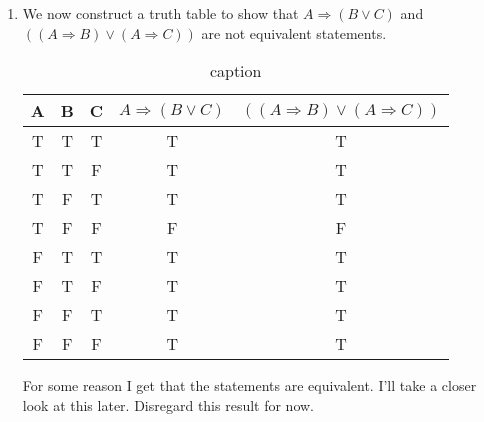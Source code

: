 \documentclass[a4paper, 11pt]{report}
\theoremstyle{plain}
\theoremstyle{definition}
\newcommand{\impl}{\Longrightarrow}
\renewcommand{\neg}{{\sim}} %
\begin{document}
\begin{enumerate}
\begin{enumerate}[a)]
        This is not very rigorous, but constructing a truth table will show
        that it holds.
      
      \item We consider the statement "Every even integer greater than 2 can be expressed as the sum of two prime numbers".
        We want to find two equivalent rephrasings of this statement. We first observe
        that it is on the form
        \begin{quote}
          For all integers $x$, if $x$ is even and $x > 2$, then $x$ can be written as the sum of two prime numbers.
        \end{quote}
        We can now consider for instance the contrapositive of this statement:
        \begin{quote}
          For all integers $x$, if $x$ cannot be written as the sum of two
          prime numbers, then $x$ is odd or $x \leq 2$.\footnote{I do
          \textbf{not}negate the quantifier here because it is not part of the
        conclusion nor the hypothesis hence does not get negated.}
        \end{quote}

        We can also rephrase the statement in terms of a contradiction. We assume the negation of the implication.
        \begin{quote}
          "If $x$ is even and $x > 2$, and $x$ cannot be written as the sum of
          two prime numbers, then $P \land \neg P$."
        \end{quote} 
        where $P$ is some arbitrary statement.
    \end{enumerate}  

    I did not consider these restatements when doing the thought-experiment. It
    does give a new perspective on the problem.

  \item We now construct a truth table to show that $A \impl (B \lor C)$ and
    $((A \impl B) \lor (A \impl C))$ are not equivalent statements.
    
    \begin{table}[h!]
      \centering
      \caption{caption}
      \label{tab:label}
      \begin{tabular}{ccccc}
        \hline
       A&  B&  C&  $A \impl (B \lor C)$& $((A \impl B) \lor (A \impl C))$\\
        \hline
       T&  T&  T&  T& T\\
       T&  T&  F&  T& T\\
       T&  F&  T&  T& T\\
       T&  F&  F&  F& F\\
       F&  T&  T&  T& T\\
       F&  T&  F&  T& T\\
       F&  F&  T&  T& T\\
       F&  F&  F&  T& T\\
        \hline
      \end{tabular}
    \end{table}
    For some reason I get that the statements are equivalent. I'll take a
    closer look at this later. Disregard this result for now.
  

\end{enumerate}
\end{document}
